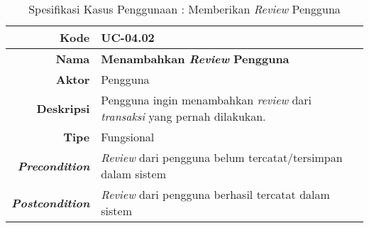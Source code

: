 	
	
	\begin{table}[H]
		\centering
		\caption{Spesifikasi Kasus Penggunaan : Memberikan \textit{Review} Pengguna}
		\label{uc04.02}
		\begin{tabular}{|r|p{8cm}|}
			\hline
			\textbf{Kode}                                                    
			& UC-04.02
			\\ \hline
			\textbf{Nama}                                                    
			& \textbf{ Menambahkan \textit{Review} Pengguna } 
			\\ \hline
			\textbf{Aktor}                                                   
			& Pengguna 
			\\ \hline
			\textbf{Deskripsi}                                               
			& Pengguna ingin menambahkan \textit{review} dari \textit{transaksi} yang pernah dilakukan.
			\\ \hline
			\textbf{Tipe}
			& Fungsional 
			\\ \hline
			
			\textbf{\textit{Precondition}}
			& \textit{Review} dari pengguna belum tercatat/tersimpan dalam sistem \\ \hline
			
			\textbf{\textit{Postcondition}} 
			& \textit{Review} dari pengguna berhasil tercatat dalam sistem
			\\ \hline
			

\end{tabular}
\end{table}
